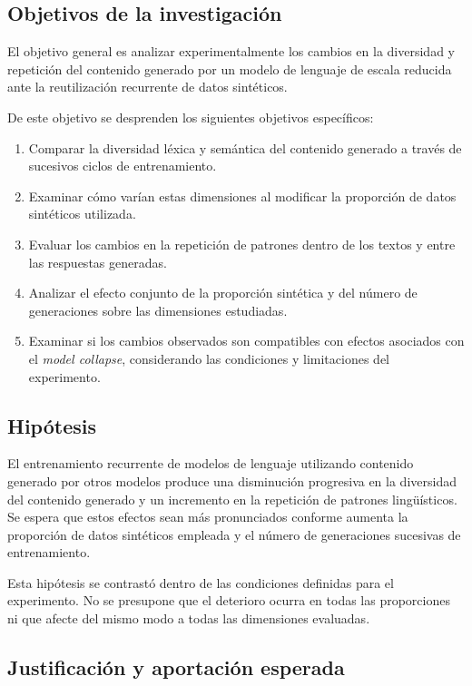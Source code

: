 \documentclass[12pt,letterpaper]{article}
\begin{document}
\subsection{Objetivos de la investigación}

El objetivo general es analizar experimentalmente los cambios en la
diversidad y repetición del contenido generado por un modelo de lenguaje
de escala reducida ante la reutilización recurrente de datos sintéticos.

De este objetivo se desprenden los siguientes objetivos específicos:
\begin{enumerate}
    \item Comparar la diversidad léxica y semántica del contenido generado
    a través de sucesivos ciclos de entrenamiento.
    \item Examinar cómo varían estas dimensiones al modificar la proporción
    de datos sintéticos utilizada.
    \item Evaluar los cambios en la repetición de patrones dentro de los
    textos y entre las respuestas generadas.
    \item Analizar el efecto conjunto de la proporción sintética y del
    número de generaciones sobre las dimensiones estudiadas.
    \item Examinar si los cambios observados son compatibles con efectos
    asociados con el \textit{model collapse}, considerando las condiciones
    y limitaciones del experimento.
\end{enumerate}

\subsection{Hipótesis}
El entrenamiento recurrente de modelos de lenguaje utilizando contenido generado por otros modelos produce una disminución progresiva en la diversidad del contenido generado y un incremento en la repetición de patrones lingüísticos. Se espera que estos efectos sean más pronunciados conforme aumenta la proporción de datos sintéticos empleada y el número de generaciones sucesivas de entrenamiento.

Esta hipótesis se contrastó dentro de las condiciones definidas para
el experimento. No se presupone que el deterioro ocurra en todas las
proporciones ni que afecte del mismo modo a todas las dimensiones evaluadas.

\subsection{Justificación y aportación esperada}
\end{document}
